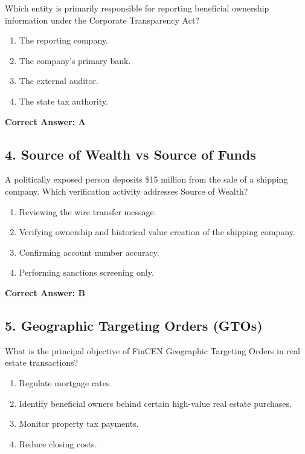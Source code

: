 \documentclass[11pt,a4paper]{article}
\begin{document}
	Which entity is primarily responsible for reporting beneficial ownership information under the Corporate Transparency Act?
	
	\begin{enumerate}[label=\Alph*.]
		\item The reporting company.
		\item The company's primary bank.
		\item The external auditor.
		\item The state tax authority.
	\end{enumerate}
	
	\textbf{Correct Answer: A}
	
	\subsection{4. Source of Wealth vs Source of Funds}
	
	A politically exposed person deposits \$15 million from the sale of a shipping company. Which verification activity addresses Source of Wealth?
	
	\begin{enumerate}[label=\Alph*.]
		\item Reviewing the wire transfer message.
		\item Verifying ownership and historical value creation of the shipping company.
		\item Confirming account number accuracy.
		\item Performing sanctions screening only.
	\end{enumerate}
	
	\textbf{Correct Answer: B}
	
	\subsection{5. Geographic Targeting Orders (GTOs)}
	
	What is the principal objective of FinCEN Geographic Targeting Orders in real estate transactions?
	
	\begin{enumerate}[label=\Alph*.]
		\item Regulate mortgage rates.
		\item Identify beneficial owners behind certain high-value real estate purchases.
		\item Monitor property tax payments.
		\item Reduce closing costs.
	\end{enumerate}
	
\end{document}

